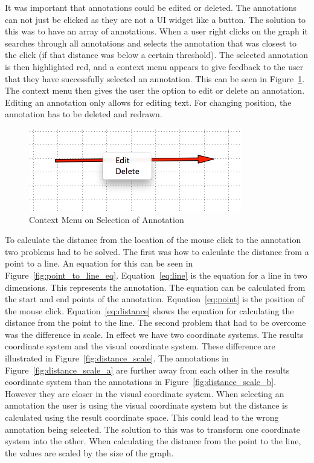 It was important that annotations could be edited or deleted.  The annotations can not just be clicked as they are not a \ac{UI} widget like a button.  The solution to this was to have an array of annotations.  When a user right clicks on the graph it searches through all annotations and selects the annotation that was closest to the click (if that distance was below a certain threshold).  The selected annotation is then highlighted red, and a context menu appears to give feedback to the user that they have successfully selected an annotation.  This can be seen in Figure~\ref{fig:annotation_selection}.  The context menu then gives the user the option to edit or delete an annotation.  Editing an annotation only allows for editing text.  For changing position, the annotation has to be deleted and redrawn.

\begin{figure}[h!]
    \centering
    \includegraphics[width=\textwidth]{images/annotation_selection.png}
    \caption{Context Menu on Selection of Annotation}
    \label{fig:annotation_selection}
\end{figure}

To calculate the distance from the location of the mouse click to the annotation two problems had to be solved.  The first was how to calculate the distance from a point to a line.  An equation for this can be seen in Figure~\ref{fig:point_to_line_eq}.  Equation~\ref{eq:line} is the equation for a line in two dimensions.  This represents the annotation.  The equation can be calculated from the start and end points of the annotation. Equation~\ref{eq:point} is the position of the mouse click.  Equation~\ref{eq:distance} shows the equation for calculating the distance from the point to the line.  The second problem that had to be overcome was the difference in scale.  In effect we have two coordinate systems.  The results coordinate system and the visual coordinate system.  These difference are illustrated in Figure~\ref{fig:distance_scale}.  The annotations in Figure~\ref{fig:distance_scale_a} are further away from each other in the results coordinate system than the annotations in Figure~\ref{fig:distance_scale_b}. However they are closer in the visual coordinate system.  When selecting an annotation the user is using the visual coordinate system but the distance is calculated using the result coordinate space.  This could lead to the wrong annotation being selected.  The solution to this was to transform one coordinate system into the other.  When calculating the distance from the point to the line, the values are scaled by the size of the graph.

